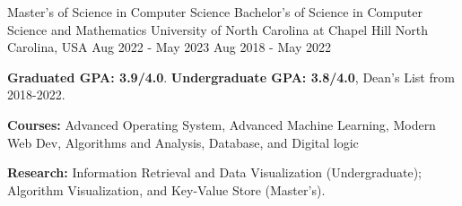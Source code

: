 

\begin{cventries}
\cvedentry
    {Master's of Science in Computer Science } %
    {Bachelor's of Science in Computer Science and Mathematics}
    {University of North Carolina at Chapel Hill} %
    {North Carolina, USA} %
    {Aug 2022 - May 2023}
    {Aug 2018 - May 2022} %
    {
      \begin{cvitems} %
        \item {\textbf{Graduated GPA: 3.9/4.0}. \textbf{Undergraduate GPA: 3.8/4.0}, Dean's List from 2018-2022. }
        \item {\textbf{Courses:} Advanced Operating System, Advanced Machine Learning, Modern Web Dev, Algorithms and Analysis, Database, and Digital logic}
        \item {\textbf{Research:}  Information Retrieval and Data Visualization (Undergraduate); Algorithm Visualization, and Key-Value Store (Master's).}
      \end{cvitems}
    }

\end{cventries}
